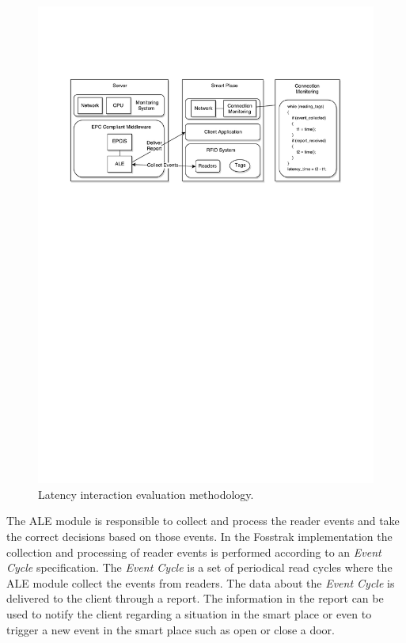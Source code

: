 \begin{figure}[ht!]
  \centering
  \includegraphics[width=.9\textwidth]{./images/eval_latency_methodology}
  \caption{Latency interaction evaluation methodology.}
  \label{fig:eval_latency_methodology}
\end{figure}

The \gls{ALE} module is responsible to collect and process the reader events and take the
correct decisions based on those events. In the Fosstrak implementation the collection and processing
of reader events is performed according to an \textit{Event Cycle} specification. The \textit{Event Cycle}
is a set of periodical read cycles where the \gls{ALE} module collect the events from readers. The data
about the \textit{Event Cycle} is delivered to the client through a report. The information in the report
can be used to notify the client regarding a situation in the smart place or even to trigger a new event
in the smart place such as open or close a door.\\

